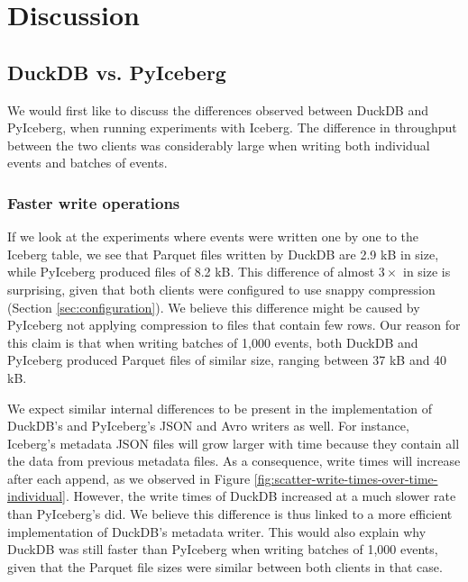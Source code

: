\chapter{Discussion}\label{ch:discussion}


\section{DuckDB vs. PyIceberg}
We would first like to discuss the differences observed between DuckDB and PyIceberg, when running experiments with Iceberg. The difference in throughput between the two clients was considerably large when writing both individual events and batches of events.

\subsection{Faster write operations}
If we look at the experiments where events were written one by one to the Iceberg table, we see that Parquet files written by DuckDB are 2.9 kB in size, while PyIceberg produced files of 8.2 kB. This difference of almost $3\times$ in size is surprising, given that both clients were configured to use snappy compression (Section \ref{sec:configuration}). We believe this difference might be caused by PyIceberg not applying compression to files that contain few rows. Our reason for this claim is that when writing batches of 1,000 events, both DuckDB and PyIceberg produced Parquet files of similar size, ranging between 37 kB and 40 kB.

We expect similar internal differences to be present in the implementation of DuckDB's and PyIceberg's JSON and Avro writers as well. For instance, Iceberg's metadata JSON files will grow larger with time because they contain all the data from previous metadata files. As a consequence, write times will increase after each append, as we observed in Figure \ref{fig:scatter-write-times-over-time-individual}. However, the write times of DuckDB increased at a much slower rate than PyIceberg's did. We believe this difference is thus linked to a more efficient implementation of DuckDB's metadata writer. This would also explain why DuckDB was still faster than PyIceberg when writing batches of 1,000 events, given that the Parquet file sizes were similar between both clients in that case.

